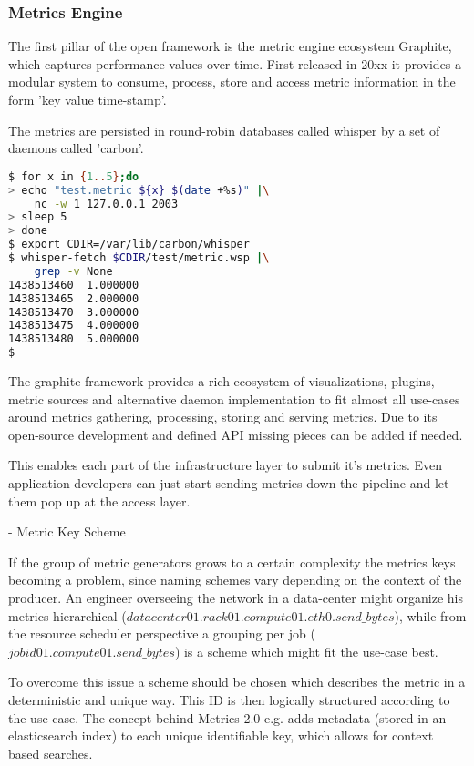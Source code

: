 \subsubsection{Metrics Engine}
The first pillar of the open framework is the metric engine ecosystem Graphite, which captures performance values over time. 
First released in 20xx it provides a modular system to consume, process, store and access metric information in the form 'key value time-stamp'.

The metrics are persisted in round-robin databases called whisper by a set of daemons called 'carbon'.

\begin{lstlisting}[language=bash,
    caption={Sending and receiving metrics using carbon in combination with a whisper file back-end.},
    label={lst:carbon_wsp}]
$ for x in {1..5};do
> echo "test.metric ${x} $(date +%s)" |\
    nc -w 1 127.0.0.1 2003
> sleep 5
> done
$ export CDIR=/var/lib/carbon/whisper
$ whisper-fetch $CDIR/test/metric.wsp |\
    grep -v None
1438513460	1.000000
1438513465	2.000000
1438513470	3.000000
1438513475	4.000000
1438513480	5.000000
$
\end{lstlisting}

The graphite framework provides a rich ecosystem of visualizations, plugins, metric sources and alternative daemon implementation to fit almost
all use-cases around metrics gathering, processing, storing and serving metrics. Due to its open-source development and defined API missing pieces
can be added if needed.

This enables each part of the infrastructure layer to submit it's metrics. Even application developers can just start sending metrics down the pipeline and
let them pop up at the access layer.

- Metric Key Scheme

If the group of metric generators grows to a certain complexity the metrics keys becoming a problem, since naming schemes vary depending on the context of
the producer. An engineer overseeing the network in a data-center might organize his metrics hierarchical ($datacenter01.rack01.compute01.eth0.send\_bytes$), while from the
resource scheduler perspective a grouping per job ($jobid01.compute01.send\_bytes$) is a scheme which might fit the use-case best.

To overcome this issue a scheme should be chosen which describes the metric in a deterministic and unique way. This ID is then logically structured according to the use-case.
The concept behind Metrics 2.0 e.g. adds metadata (stored in an elasticsearch index) to each unique identifiable key, which allows for context based searches.

